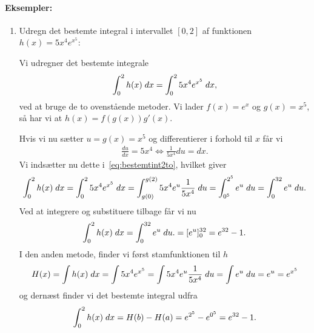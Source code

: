 \paragraph*{Eksempler:}
\begin{enumerate}
\item Udregn det bestemte integral i intervallet $[0,2]$ af funktionen $h(x)=5x^4e^{x^5}$:

Vi udregner det bestemte integrale
\begin{align}\label{eq:bestemtint2to}
\int_0^2 h(x) \; d x = \int_0^2 5x^4e^{x^5} \; d x,
\end{align}
ved at bruge de to ovenstående metoder. Vi lader $f(x)=e^x$ og $g(x)=x^5$, så har vi at $h(x)=f(g(x))g'(x)$.

Hvis vi nu sætter $u=g(x)=x^5$ og differentierer i forhold til $x$ får vi
\begin{align*}
\frac{du}{dx}=5x^4 \Leftrightarrow \frac{1}{5x^4} d u = dx.
\end{align*}
Vi indsætter nu dette i~\eqref{eq:bestemtint2to}, hvilket giver
\begin{align*}
\int_0^2 h(x) \; d x = \int_0^2 5x^4e^{x^5} \; d x = \int_{g(0)}^{g(2)} 5x^4 e^u \frac{1}{5x^4} \; d u = \int_{0^5}^{2^5} e^u \; d u = \int_0^{32} e^u \; d u.
\end{align*}
Ved at integrere og substituere tilbage får vi nu
\begin{align*}
\int_0^2 h(x) \; d x = \int_0^{32} e^u \; d u. = [e^u]_0^{32} = e^{32}-1.
\end{align*}
I den anden metode, finder vi først stamfunktionen til $h$
\begin{align*}
H(x)=\int h(x) \; d x = \int 5 x^4e^{x^5} = \int 5x^4 e^u \frac{1}{5x^4} \; d u = \int e^u \; d u = e^u = e^{x^5}
\end{align*}
og dernæst finder vi det bestemte integral udfra
\begin{align*}
\int_0^2 h(x) \; d x = H(b) - H(a) = e^{2^5}-e^{0^5} = e^{32} - 1.
\end{align*}
\end{enumerate}











